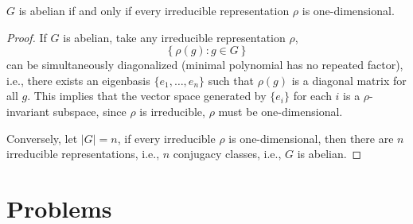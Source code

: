 \begin{prop}
    $G$ is abelian if and only if every irreducible representation $\rho$ is one-dimensional.
\end{prop}
\begin{proof}
    If $G$ is abelian, take any irreducible representation $\rho$, 
    \begin{equation*}
        \left\{\rho(g): g\in G\right\}
    \end{equation*}
    can be simultaneously diagonalized (minimal polynomial has no repeated factor), i.e., there exists an eigenbasis $\{e_1,\dots,e_n\}$ such that $\rho(g)$ is a diagonal matrix for all $g$. This implies that the vector space generated by $\{e_i\}$ for each $i$ is a $\rho$-invariant subspace, since $\rho$ is irreducible, $\rho$ must be one-dimensional. 

    Conversely, let $|G|=n$, if every irreducible $\rho$ is one-dimensional, then there are $n$ irreducible representations, i.e., $n$ conjugacy classes, i.e., $G$ is abelian.
\end{proof}

\section{Problems}

